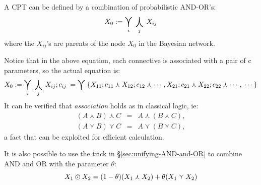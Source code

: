A CPT can be defined by a combination of probabilistic AND-OR's:
\begin{equation}
X_0 := \bigcurlyvee_i \; \bigcurlywedge_j \; X_{ij}
\end{equation}
where the $X_{ij}$'s are parents of the node $X_0$ in the Bayesian network.

Notice that in the above equation, each connective is associated with a pair of c parameters, so the actual equation is:
\begin{equation}
X_0 := \bigcurlyvee_i \; \bigcurlywedge_j \; X_{ij};c_{ij} \; = \bigcurlyvee \; \{ X_{11};c_{11} \curlywedge X_{12};c_{12} \curlywedge \cdots, X_{21};c_{21} \curlywedge X_{22};c_{22} \curlywedge \cdots, \; \cdots \}
\end{equation}
It can be verified that \emph{association} holds as in classical logic, ie:
\begin{eqnarray}
(A \curlywedge B) \curlywedge C & = & A \curlywedge (B \curlywedge C), \\
(A \curlyvee   B) \curlyvee   C & = & A \curlyvee   (B \curlyvee   C),
\end{eqnarray}
a fact that can be exploited for efficient calculation.

It is also possible to use the trick in \S\ref{sec:unifying-AND-and-OR} to combine AND and OR with the parameter $\theta$:
\begin{equation}
X_1 \varodot X_2 = (1-\theta) (X_1 \curlywedge X_2) + \theta (X_1 \curlyvee X_2)
\end{equation}

